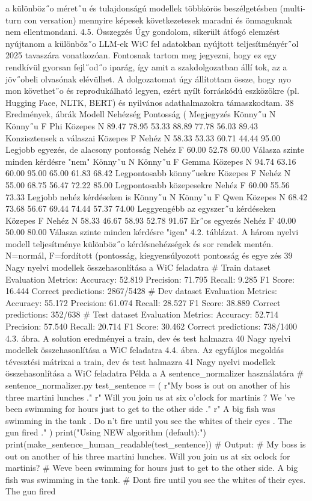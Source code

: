 \documentclass[12pt]{report}
\theoremstyle{definition}
\begin{document}
 a különböz˝o méret˝u és tulajdonságú modellek többkörös beszélgetésben (multi-turn con
versation) mennyire képesek következetesek maradni és önmaguknak nem ellentmondani.
 4.5. Összegzés
 Úgy gondolom, sikerült átfogó elemzést nyújtanom a különböz˝o LLM-ek WiC fel
adatokban nyújtott teljesítményér˝ol 2025 tavaszára vonatkozóan. Fontosnak tartom meg
jegyezni, hogy ez egy rendkívül gyorsan fejl˝od˝o iparág, így amit a szakdolgozatban állí
tok, az a jöv˝obeli olvasónak elévülhet. A dolgozatomat úgy állítottam össze, hogy nyo
mon követhet˝o és reprodukálható legyen, ezért nyílt forráskódú eszközökre (pl. Hugging
 Face, NLTK, BERT) és nyilvános adathalmazokra támaszkodtam.
 38
Eredmények, ábrák
 Modell Nehézség Pontosság (%
 Megjegyzés
 Könny˝u N
 Könny˝u F
 Phi
 Közepes N
 89.47
 78.95
 53.33
 88.89
 77.78
 56.03
 89.43
 Konzisztensek a válaszai
 Közepes F
 Nehéz N
 58.33
 53.33
 60.71
 44.44
 95.00
 Legjobb egyezés, de alacsony pontosság
 Nehéz F
 60.00
 52.78
 60.00
 Válasza szinte minden kérdésre "nem"
 Könny˝u N
 Könny˝u F
 Gemma
 Közepes N
 94.74
 63.16
 60.00
 95.00
 65.00
 61.83
 68.42
 Legpontosabb könny˝uekre
 Közepes F
 Nehéz N
 55.00
 68.75
 56.47
 72.22
 85.00
 Legpontosabb közepesekre
 Nehéz F
 60.00
 55.56
 73.33
 Legjobb nehéz kérdéseken is
 Könny˝u N
 Könny˝u F
 Qwen
 Közepes N
 68.42
 73.68
 56.67
 69.44
 74.44
 57.37
 74.00
 Leggyengébb az egyszer˝u kérdéseken
 Közepes F
 Nehéz N
 58.33
 46.67
 58.93
 52.78
 91.67
 Er˝os egyezés
 Nehéz F
 40.00
 50.00
 80.00
 Válasza szinte minden kérdésre "igen"
 4.2. táblázat. A három nyelvi modell teljesítménye különböz˝o kérdésnehézségek és sor
rendek mentén. N=normál, F=fordított (pontosság, kiegyensúlyozott pontosság és egye
zés %
 39
Nagy nyelvi modellek összehasonlítása a WiC feladatra
 # Train dataset
 Evaluation Metrics:
 Accuracy: 52.819%
 Precision: 71.795%
 Recall: 9.285%
 F1 Score: 16.444%
 Correct predictions: 2867/5428
 # Dev dataset
 Evaluation Metrics:
 Accuracy: 55.172%
 Precision: 61.074%
 Recall: 28.527%
 F1 Score: 38.889%
 Correct predictions: 352/638
 # Test dataset
 Evaluation Metrics:
 Accuracy: 52.714%
 Precision: 57.540%
 Recall: 20.714%
 F1 Score: 30.462%
 Correct predictions: 738/1400
 4.3. ábra. A solution eredményei a train, dev és test halmazra
 40
Nagy nyelvi modellek összehasonlítása a WiC feladatra
 4.4. ábra. Az egyfájlos megoldás tévesztési mátrixai a train, dev és test halmazra
 41
Nagy nyelvi modellek összehasonlítása a WiC feladatra
 Példa a A sentence_normalizer használatára
 # sentence_normalizer.py
 test_sentence = (
 r"My boss is out on another of his three martini lunches ."
 r" Will you join us at six o’clock for martinis ? We ’ve
 been swimming for hours just to get to the other side ."
 r" A big fish was swimming in the tank . Do n’t fire until
 you see the whites of their eyes . The gun fired ."
 )
 print("Using NEW algorithm (default):")
 print(make_sentence_human_readable(test_sentence))
 # Output:
 # My boss is out on another of his three martini lunches.
 Will you join us at six o\’clock for martinis?
 # We\’ve been swimming for hours just to get to the other
 side. A big fish was swimming in the tank.
 # Don\’t fire until you see the whites of their eyes. The
 gun fired
\end{document}
